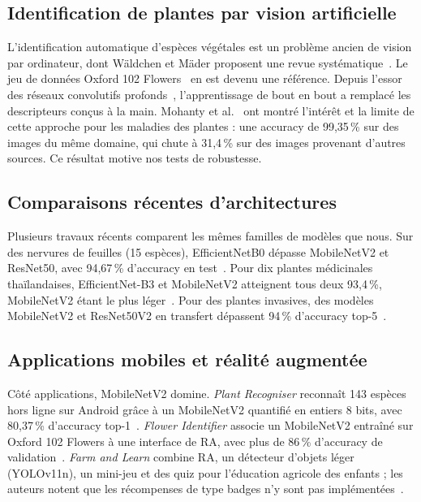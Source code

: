 \documentclass[conference]{IEEEtran}
\begin{document}
\subsection{Identification de plantes par vision artificielle}
L'identification automatique d'espèces végétales est un problème ancien de vision par ordinateur, dont Wäldchen et Mäder proposent une revue systématique~\cite{waldchen2018}. Le jeu de données Oxford 102 Flowers~\cite{nilsback2008} en est devenu une référence. Depuis l'essor des réseaux convolutifs profonds~\cite{krizhevsky2012}, l'apprentissage de bout en bout a remplacé les descripteurs conçus à la main. Mohanty et al.~\cite{mohanty2016} ont montré l'intérêt et la limite de cette approche pour les maladies des plantes : une accuracy de 99,35\,\% sur des images du même domaine, qui chute à 31,4\,\% sur des images provenant d'autres sources. Ce résultat motive nos tests de robustesse.

\subsection{Comparaisons récentes d'architectures}
Plusieurs travaux récents comparent les mêmes familles de modèles que nous. Sur des nervures de feuilles (15 espèces), EfficientNetB0 dépasse MobileNetV2 et ResNet50, avec 94,67\,\% d'accuracy en test~\cite{bharadwaj2025}. Pour dix plantes médicinales thaïlandaises, EfficientNet-B3 et MobileNetV2 atteignent tous deux 93,4\,\%, MobileNetV2 étant le plus léger~\cite{valuvanathorn2026}. Pour des plantes invasives, des modèles MobileNetV2 et ResNet50V2 en transfert dépassent 94\,\% d'accuracy top-5~\cite{yao2025}.

\subsection{Applications mobiles et réalité augmentée}
Côté applications, MobileNetV2 domine. \emph{Plant Recogniser} reconnaît 143 espèces hors ligne sur Android grâce à un MobileNetV2 quantifié en entiers 8 bits, avec 80,37\,\% d'accuracy top-1~\cite{foamete2025}. \emph{Flower Identifier} associe un MobileNetV2 entraîné sur Oxford 102 Flowers à une interface de RA, avec plus de 86\,\% d'accuracy de validation~\cite{bolohan2025}. \emph{Farm and Learn} combine RA, un détecteur d'objets léger (YOLOv11n), un mini-jeu et des quiz pour l'éducation agricole des enfants ; les auteurs notent que les récompenses de type badges n'y sont pas implémentées~\cite{desilva2026}.
\end{document}
